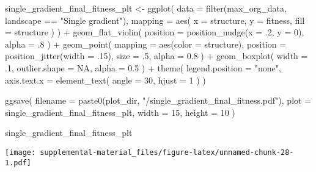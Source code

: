 \documentclass[
]{book}
\newenvironment{Shaded}{\begin{snugshade}}{\end{snugshade}}
\newcommand{\AttributeTok}[1]{\textcolor[rgb]{0.77,0.63,0.00}{#1}}
\newcommand{\ConstantTok}[1]{\textcolor[rgb]{0.00,0.00,0.00}{#1}}
\newcommand{\DecValTok}[1]{\textcolor[rgb]{0.00,0.00,0.81}{#1}}
\newcommand{\FloatTok}[1]{\textcolor[rgb]{0.00,0.00,0.81}{#1}}
\newcommand{\FunctionTok}[1]{\textcolor[rgb]{0.00,0.00,0.00}{#1}}
\newcommand{\NormalTok}[1]{#1}
\newcommand{\OtherTok}[1]{\textcolor[rgb]{0.56,0.35,0.01}{#1}}
\newcommand{\SpecialCharTok}[1]{\textcolor[rgb]{0.00,0.00,0.00}{#1}}
\newcommand{\StringTok}[1]{\textcolor[rgb]{0.31,0.60,0.02}{#1}}
\begin{document}
\begin{Shaded}
\begin{Highlighting}[]
\NormalTok{single\_gradient\_final\_fitness\_plt }\OtherTok{\textless{}{-}} \FunctionTok{ggplot}\NormalTok{(}
    \AttributeTok{data =} \FunctionTok{filter}\NormalTok{(max\_org\_data, landscape }\SpecialCharTok{==} \StringTok{"Single gradient"}\NormalTok{),}
    \AttributeTok{mapping =} \FunctionTok{aes}\NormalTok{(}
      \AttributeTok{x =}\NormalTok{ structure,}
      \AttributeTok{y =}\NormalTok{ fitness,}
      \AttributeTok{fill =}\NormalTok{ structure}
\NormalTok{    )}
\NormalTok{  ) }\SpecialCharTok{+}
  \FunctionTok{geom\_flat\_violin}\NormalTok{(}
    \AttributeTok{position =} \FunctionTok{position\_nudge}\NormalTok{(}\AttributeTok{x =}\NormalTok{ .}\DecValTok{2}\NormalTok{, }\AttributeTok{y =} \DecValTok{0}\NormalTok{),}
    \AttributeTok{alpha =}\NormalTok{ .}\DecValTok{8}
\NormalTok{  ) }\SpecialCharTok{+}
  \FunctionTok{geom\_point}\NormalTok{(}
    \AttributeTok{mapping =} \FunctionTok{aes}\NormalTok{(}\AttributeTok{color =}\NormalTok{ structure),}
    \AttributeTok{position =} \FunctionTok{position\_jitter}\NormalTok{(}\AttributeTok{width =}\NormalTok{ .}\DecValTok{15}\NormalTok{),}
    \AttributeTok{size =}\NormalTok{ .}\DecValTok{5}\NormalTok{,}
    \AttributeTok{alpha =} \FloatTok{0.8}
\NormalTok{  ) }\SpecialCharTok{+}
  \FunctionTok{geom\_boxplot}\NormalTok{(}
    \AttributeTok{width =}\NormalTok{ .}\DecValTok{1}\NormalTok{,}
    \AttributeTok{outlier.shape =} \ConstantTok{NA}\NormalTok{,}
    \AttributeTok{alpha =} \FloatTok{0.5}
\NormalTok{  ) }\SpecialCharTok{+}
  \FunctionTok{theme}\NormalTok{(}
    \AttributeTok{legend.position =} \StringTok{"none"}\NormalTok{,}
    \AttributeTok{axis.text.x =} \FunctionTok{element\_text}\NormalTok{(}
      \AttributeTok{angle =} \DecValTok{30}\NormalTok{,}
      \AttributeTok{hjust =} \DecValTok{1}
\NormalTok{    )}
\NormalTok{  )}

\FunctionTok{ggsave}\NormalTok{(}
  \AttributeTok{filename =} \FunctionTok{paste0}\NormalTok{(plot\_dir, }\StringTok{"/single\_gradient\_final\_fitness.pdf"}\NormalTok{),}
  \AttributeTok{plot =}\NormalTok{ single\_gradient\_final\_fitness\_plt,}
  \AttributeTok{width =} \DecValTok{15}\NormalTok{,}
  \AttributeTok{height =} \DecValTok{10}
\NormalTok{)}

\NormalTok{single\_gradient\_final\_fitness\_plt}
\end{Highlighting}
\end{Shaded}

\texttt{[image: supplemental-material\_files/figure-latex/unnamed-chunk-28-1.pdf]}
\end{document}
